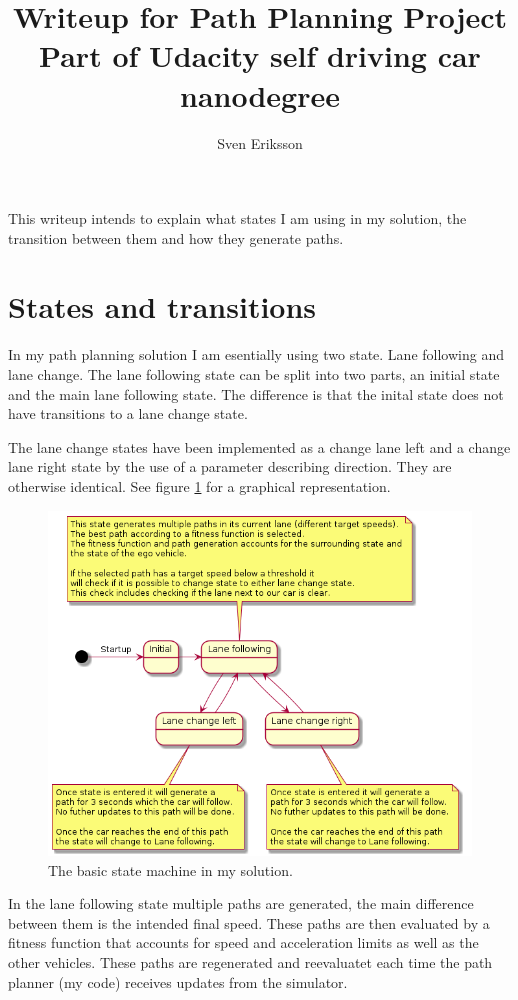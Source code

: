 \documentclass[12pt,a4paper]{article}
\author{Sven Eriksson}
\title{Writeup for Path Planning Project \\ \large{Part of Udacity self driving car nanodegree}}
\begin{document}
\maketitle

This writeup intends to explain what states I am using in my solution, the transition between them and how they generate paths.

\section{States and transitions}

In my path planning solution I am esentially using two state. Lane following and lane change. The lane following state can be split into two parts, an initial state and the main lane following state. The difference is that the inital state does not have transitions to a lane change state.

The lane change states have been implemented as a change lane left and a change lane right state by the use of a parameter describing direction. They are otherwise identical. See figure \ref{fig:stateMachine} for a graphical representation.

\begin{figure}[h!]
  \centering
    \includegraphics[width=\textwidth]{stateMachine.png}
      \caption{The basic state machine in my solution.}
      \label{fig:stateMachine}
\end{figure}

In the lane following state multiple paths are generated, the main difference between them is the intended final speed. These paths are then evaluated by a fitness function that accounts for speed and acceleration limits as well as the other vehicles. These paths are regenerated and reevaluatet each time the path planner (my code) receives updates from the simulator.
\end{document}
